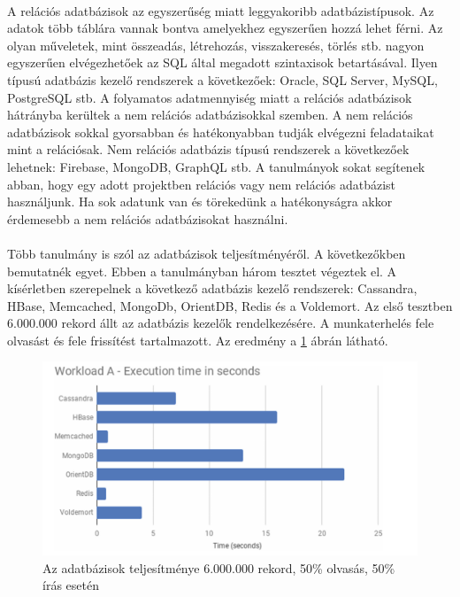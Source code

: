 \paragraph{}
A relációs adatbázisok az egyszerűség miatt leggyakoribb adatbázistípusok. Az adatok több táblára vannak bontva amelyekhez egyszerűen hozzá lehet férni. Az olyan műveletek, mint összeadás, létrehozás, visszakeresés, törlés stb. nagyon egyszerűen elvégezhetőek az SQL által megadott szintaxisok betartásával. Ilyen típusú adatbázis kezelő rendszerek a következőek: Oracle, SQL Server, MySQL, PostgreSQL stb. A folyamatos adatmennyiség miatt a relációs adatbázisok hátrányba kerültek a nem relációs adatbázisokkal szemben. A nem relációs adatbázisok sokkal gyorsabban és hatékonyabban tudják elvégezni feladataikat mint a relációsak. Nem relációs adatbázis típusú rendszerek a következőek lehetnek: Firebase, MongoDB, GraphQL stb.\cite{gupta2017nosql} A tanulmányok sokat segítenek abban, hogy egy adott projektben relációs vagy nem relációs adatbázist használjunk. Ha sok adatunk van és törekedünk a hatékonyságra akkor érdemesebb a nem relációs adatbázisokat használni. 
\paragraph{}
Több tanulmány is szól az adatbázisok teljesítményéről. A következőkben bemutatnék egyet. Ebben a tanulmányban három tesztet végeztek el. A kísérletben szerepelnek a következő adatbázis kezelő rendszerek: Cassandra, HBase, Memcached, MongoDb, OrientDB, Redis és a Voldemort.\cite{martins2019study} Az első tesztben 6.000.000 rekord állt az adatbázis kezelők rendelkezésére. A munkaterhelés fele olvasást és fele frissítést tartalmazott. Az eredmény a \ref{fig:performance_a} ábrán látható.
	
\begin{figure}
	\centering
	\includegraphics[scale=0.9]{figures/images/performance_a.png}
	\caption{Az adatbázisok teljesítménye 6.000.000 rekord, 50\% olvasás, 50\% írás esetén \cite{martins2019study}}
	\label{fig:performance_a}
\end{figure}

